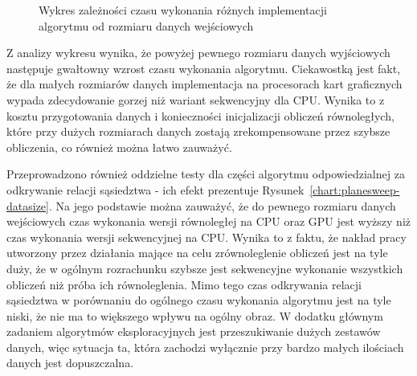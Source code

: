 \documentclass[12pt]{article}
\begin{document}
\begin{figure}[H]
\caption{Wykres zależności czasu wykonania różnych implementacji algorytmu od rozmiaru danych wejściowych}
\label{chart:datasize}
\end{figure}

Z analizy wykresu wynika, że powyżej pewnego rozmiaru danych wyjściowych następuje gwałtowny wzrost czasu wykonania algorytmu. Ciekawostką jest fakt, że dla małych rozmiarów danych implementacja na procesorach kart graficznych wypada zdecydowanie gorzej niż wariant sekwencyjny dla CPU. Wynika to z kosztu przygotowania danych i konieczności inicjalizacji obliczeń równoległych, które przy dużych rozmiarach danych zostają zrekompensowane przez szybsze obliczenia, co również można łatwo zauważyć.

Przeprowadzono również oddzielne testy dla części algorytmu odpowiedzialnej za odkrywanie relacji sąsiedztwa - ich efekt prezentuje Rysunek~\ref{chart:planesweep-datasize}. Na jego podstawie można zauważyć, że do pewnego rozmiaru danych wejściowych czas wykonania wersji równoległej na CPU oraz GPU jest wyższy niż czas wykonania wersji sekwencyjnej na CPU. Wynika to z faktu, że nakład pracy utworzony przez działania mające na celu zrównoleglenie obliczeń jest na tyle duży, że w ogólnym rozrachunku szybsze jest sekwencyjne wykonanie wszystkich obliczeń niż próba ich równoleglenia. Mimo tego czas odkrywania relacji sąsiedztwa w porównaniu do ogólnego czasu wykonania algorytmu jest na tyle niski, że nie ma to większego wpływu na ogólny obraz. W dodatku głównym zadaniem algorytmów eksploracyjnych jest przeszukiwanie dużych zestawów danych, więc sytuacja ta, która zachodzi wyłącznie przy bardzo małych ilościach danych jest dopuszczalna.
\end{document}
